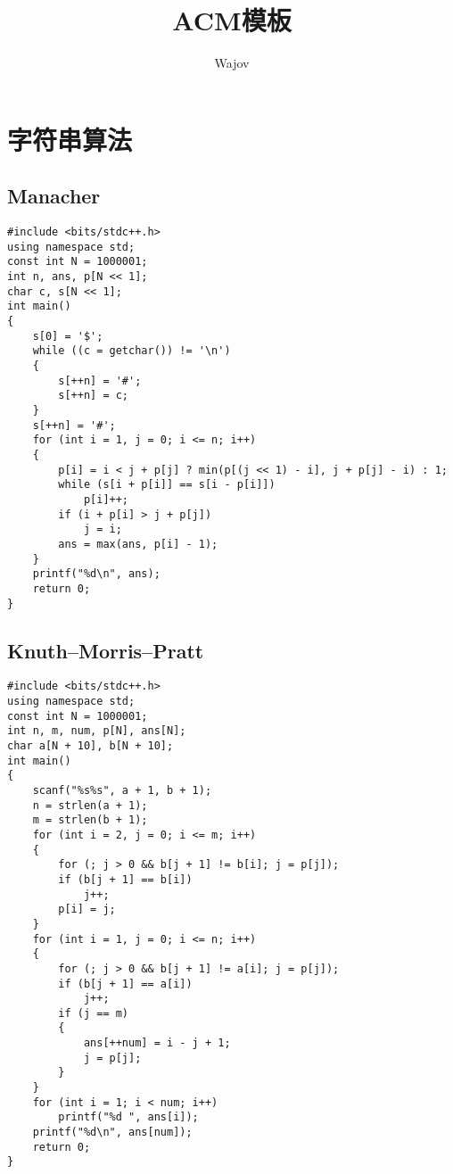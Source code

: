 \documentclass[a4paper]{article}
\title{ACM模板}
\author{Wajov}
\begin{document}
\maketitle
\renewcommand{\contentsname}{目录}
\tableofcontents
\newpage
{}
\section{字符串算法}
\subsection{Manacher}
\begin{lstlisting}
#include <bits/stdc++.h>
using namespace std;
const int N = 1000001;
int n, ans, p[N << 1];
char c, s[N << 1];
int main()
{
    s[0] = '$';
    while ((c = getchar()) != '\n')
    {
        s[++n] = '#';
        s[++n] = c;
    }
    s[++n] = '#';
    for (int i = 1, j = 0; i <= n; i++)
    {
        p[i] = i < j + p[j] ? min(p[(j << 1) - i], j + p[j] - i) : 1;
        while (s[i + p[i]] == s[i - p[i]])
            p[i]++;
        if (i + p[i] > j + p[j])
            j = i;
        ans = max(ans, p[i] - 1);
    }
    printf("%d\n", ans);
    return 0;
}
\end{lstlisting}
\subsection{Knuth–Morris–Pratt}
\begin{lstlisting}
#include <bits/stdc++.h>
using namespace std;
const int N = 1000001;
int n, m, num, p[N], ans[N];
char a[N + 10], b[N + 10];
int main()
{
    scanf("%s%s", a + 1, b + 1);
    n = strlen(a + 1);
    m = strlen(b + 1);
    for (int i = 2, j = 0; i <= m; i++)
    {
        for (; j > 0 && b[j + 1] != b[i]; j = p[j]);
        if (b[j + 1] == b[i])
            j++;
        p[i] = j;
    }
    for (int i = 1, j = 0; i <= n; i++)
    {
        for (; j > 0 && b[j + 1] != a[i]; j = p[j]);
        if (b[j + 1] == a[i])
            j++;
        if (j == m)
        {
            ans[++num] = i - j + 1;
            j = p[j];
        }
    }
    for (int i = 1; i < num; i++)
        printf("%d ", ans[i]);
    printf("%d\n", ans[num]);
    return 0;
}
\end{lstlisting}
\end{document}
